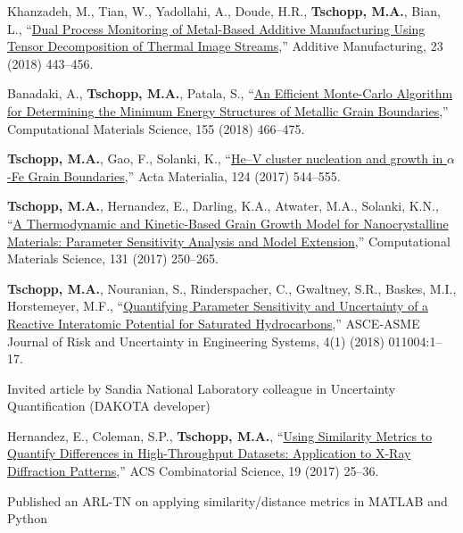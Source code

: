 \begin{cvlist}
\item
{Khanzadeh, M.}, Tian, W., Yadollahi, A., Doude, H.R., \textbf{Tschopp, M.A.}, Bian, L., ``\href{https://doi.org/10.1016/j.addma.2018.08.014}{Dual Process Monitoring of Metal-Based Additive Manufacturing Using Tensor Decomposition of Thermal Image Streams},'' Additive Manufacturing, 23 (2018) 443--456.

\item
{Banadaki, A.}, \textbf{Tschopp, M.A.}, Patala, S., ``\href{https://doi.org/10.1016/j.commatsci.2018.09.017}{An Efficient Monte-Carlo Algorithm for Determining the Minimum Energy Structures of Metallic Grain Boundaries},'' Computational Materials Science, 155 (2018) 466--475.

\item
{\textbf{Tschopp, M.A.}}, Gao, F., Solanki, K.,  ``\href{http://dx.doi.org/10.1016/j.actamat.2016.11.027}{He--V cluster nucleation and growth in $\alpha$-Fe Grain Boundaries},'' Acta Materialia, 124 (2017) 544--555.

\item
{\textbf{Tschopp, M.A.}}, {Hernandez, E.}, Darling, K.A., Atwater, M.A., Solanki, K.N., ``\href{http://dx.doi.org/10.1016/j.commatsci.2017.02.002}{A Thermodynamic and Kinetic-Based Grain Growth Model for Nanocrystalline Materials: Parameter Sensitivity Analysis and Model Extension},'' Computational Materials Science, 131 (2017) 250--265.

\item
{\textbf{Tschopp, M.A.}}, {Nouranian, S.}, Rinderspacher, C., Gwaltney, S.R., Baskes, M.I.,  Horstemeyer, M.F., ``\href{http://dx.doi.org/10.1115/1.4037455}{Quantifying Parameter Sensitivity and Uncertainty of a Reactive Interatomic Potential for Saturated Hydrocarbons},'' ASCE-ASME Journal of Risk and Uncertainty in Engineering Systems, 4(1) (2018) 011004:1--17.
\begin{list2}
\item[$\star$] Invited article by Sandia National Laboratory colleague in Uncertainty Quantification (DAKOTA developer)
\end{list2}

\item
{Hernandez, E.}, {Coleman, S.P.}, {\textbf{Tschopp, M.A.}}, ``\href{http://dx.doi.org/10.1021/acscombsci.6b00142}{Using Similarity Metrics to Quantify Differences in High-Throughput Datasets: Application to X-Ray Diffraction Patterns},'' ACS Combinatorial Science, 19 (2017) 25--36.
\begin{list2}
\item[$\star$] Published an ARL-TN on applying similarity/distance metrics in MATLAB and Python
\end{list2}


\end{cvlist}
